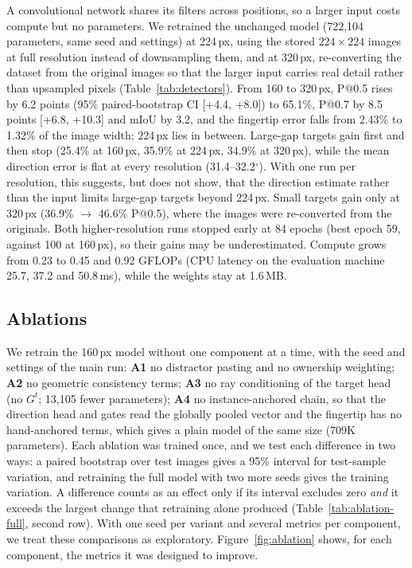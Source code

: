 A convolutional network shares its filters across positions, so a larger input costs compute but no parameters. We retrained the unchanged model (722,104 parameters, same seed and settings) at 224\,px, using the stored $224\times224$ images at full resolution instead of downsampling them, and at 320\,px, re-converting the dataset from the original images so that the larger input carries real detail rather than upsampled pixels (Table~\ref{tab:detectors}). From 160 to 320\,px, P@0.5 rises by 6.2 points (95\% paired-bootstrap CI [+4.4, +8.0]) to 65.1\%, P@0.7 by 8.5 points [+6.8, +10.3] and mIoU by 3.2, and the fingertip error falls from 2.43\% to 1.32\% of the image width; 224\,px lies in between. Large-gap targets gain first and then stop (25.4\% at 160\,px, 35.9\% at 224\,px, 34.9\% at 320\,px), while the mean direction error is flat at every resolution (31.4--32.2$^\circ$). With one run per resolution, this suggests, but does not show, that the direction estimate rather than the input limits large-gap targets beyond 224\,px. Small targets gain only at 320\,px (36.9\% $\to$ 46.6\% P@0.5), where the images were re-converted from the originals. Both higher-resolution runs stopped early at 84 epochs (best epoch 59, against 100 at 160\,px), so their gains may be underestimated. Compute grows from 0.23 to 0.45 and 0.92 GFLOPs (CPU latency on the evaluation machine 25.7, 37.2 and 50.8\,ms), while the weights stay at 1.6\,MB.

\subsection{Ablations}\label{app:ablation}

We retrain the 160\,px model without one component at a time, with the seed and settings of the main run: \textbf{A1} no distractor pasting and no ownership weighting; \textbf{A2} no geometric consistency terms; \textbf{A3} no ray conditioning of the target head (no $G^t$; 13,105 fewer parameters); \textbf{A4} no instance-anchored chain, so that the direction head and gates read the globally pooled vector and the fingertip has no hand-anchored terms, which gives a plain model of the same size (709K parameters). Each ablation was trained once, and we test each difference in two ways: a paired bootstrap over test images gives a 95\% interval for test-sample variation, and retraining the full model with two more seeds gives the training variation. A difference counts as an effect only if its interval excludes zero \emph{and} it exceeds the largest change that retraining alone produced (Table~\ref{tab:ablation-full}, second row). With one seed per variant and several metrics per component, we treat these comparisons as exploratory. Figure~\ref{fig:ablation} shows, for each component, the metrics it was designed to improve.

